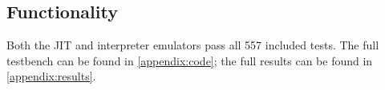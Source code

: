 \subsection{Functionality}

Both the JIT and interpreter emulators pass all 557 included tests. The full testbench can be found in \autoref{appendix:code}; the full results can be found in \autoref{appendix:results}.
